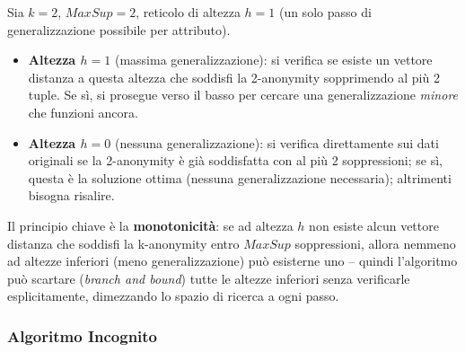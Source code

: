 \documentclass[a4paper,11pt]{article}
\begin{document}
\begin{esempio}
Sia $k=2$, $MaxSup=2$, reticolo di altezza $h=1$ (un solo passo di generalizzazione possibile per attributo).
\begin{itemize}
  \item \textbf{Altezza $h=1$} (massima generalizzazione): si verifica se esiste un vettore distanza a questa altezza che soddisfi la 2-anonymity sopprimendo al pi\`{u} 2 tuple. Se s\`{i}, si prosegue verso il basso per cercare una generalizzazione \emph{minore} che funzioni ancora.
  \item \textbf{Altezza $h=0$} (nessuna generalizzazione): si verifica direttamente sui dati originali se la 2-anonymity \`{e} gi\`{a} soddisfatta con al pi\`{u} 2 soppressioni; se s\`{i}, questa \`{e} la soluzione ottima (nessuna generalizzazione necessaria); altrimenti bisogna risalire.
\end{itemize}
Il principio chiave \`{e} la \textbf{monotonicit\`{a}}: se ad altezza $h$ non esiste alcun vettore distanza che soddisfi la k-anonymity entro $MaxSup$ soppressioni, allora nemmeno ad altezze inferiori (meno generalizzazione) pu\`{o} esisterne uno -- quindi l'algoritmo pu\`{o} scartare (\emph{branch and bound}) tutte le altezze inferiori senza verificarle esplicitamente, dimezzando lo spazio di ricerca a ogni passo.
\end{esempio}

\subsubsection{Algoritmo Incognito}
\end{document}
